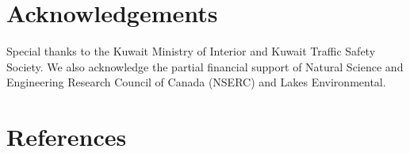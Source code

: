 \documentclass[preprint,12pt,a4paper]{elsarticle}
\begin{document}
\begin{linenumbers}
\section{Acknowledgements}
Special thanks to the Kuwait Ministry of Interior and Kuwait Traffic Safety Society.  We also acknowledge the partial financial support of Natural Science and Engineering Research Council of Canada (NSERC) and Lakes Environmental.
 
\section{References}

\end{linenumbers}
{}

\end{document}

